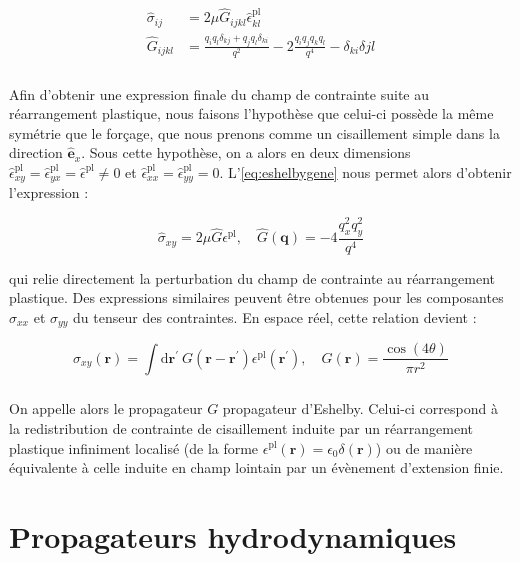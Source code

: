 \begin{equation}
\begin{aligned}
	\hat{\sigma}_{ij} &= 2\mu \hat{G}_{ijkl}\hat{\epsilon}_{kl}^\text{pl}\\
	\hat{G}_{ijkl} &= \frac{q_i q_l\delta_{kj}+q_j q_l\delta_{ki}}{q^2}-2\frac{q_iq_jq_kq_l}{q^4}-\delta_{ki}\delta{jl}
\end{aligned}
\label{eq:eshelbygene}
\end{equation}

\subparagraph{}Afin d'obtenir une expression finale du champ de contrainte suite au réarrangement plastique, nous faisons l'hypothèse que celui-ci possède la même symétrie que le forçage, que nous prenons comme un cisaillement simple dans la direction $\hat{\mathbf{e}}_x$. Sous cette hypothèse, on a alors en deux dimensions $\hat{\epsilon}_{xy}^\text{pl} = \hat{\epsilon}_{yx}^\text{pl} = \hat{\epsilon}^\text{pl} \neq 0$ et $\hat{\epsilon}_{xx}^\text{pl} = \hat{\epsilon}_{yy}^\text{pl} = 0$. L'\autoref{eq:eshelbygene} nous permet alors d'obtenir l'expression :

\begin{equation}
	\hat{\sigma}_{xy} = 2\mu \hat{G} \epsilon^\text{pl}, \quad \hat{G}(\mathbf{q}) = -4\frac{q_x^2q_y^2}{q^4}
\end{equation}

\noindent qui relie directement la perturbation du champ de contrainte au réarrangement plastique. Des expressions similaires peuvent être obtenues pour les composantes $\sigma_{xx}$ et $\sigma_{yy}$ du tenseur des contraintes. En espace réel, cette relation devient :

\begin{equation}
	\sigma_{xy}(\mathbf{r}) = \int\mathrm{d}\mathbf{r}^\prime~G(\mathbf{r}-\mathbf{r}^\prime)\epsilon^\text{pl}(\mathbf{r}^\prime), \quad G(\mathbf{r}) = \frac{\cos (4\theta)}{\pi r^2}
	\label{eq:EshelbyReel}
\end{equation}

\subparagraph{}On appelle alors le propagateur $G$ propagateur d'Eshelby. Celui-ci correspond à la redistribution de contrainte de cisaillement induite par un réarrangement plastique infiniment localisé (de la forme $\epsilon^\text{pl}(\mathbf{r}) = \epsilon_0 \delta (\mathbf{r})$) ou de manière équivalente à celle induite en champ lointain par un évènement d'extension finie.

\section{Propagateurs hydrodynamiques}

